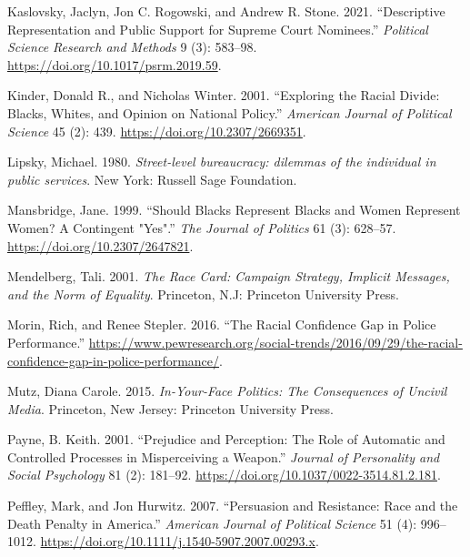 \documentclass[
  12pt,
]{article}
\newlength{\cslhangindent}
\newlength{\cslentryspacingunit} %
\newenvironment{CSLReferences}[2] %
 {%
  \setlength{\parindent}{0pt}
  \ifodd #1
  \let\oldpar\par
  \def\par{\hangindent=\cslhangindent\oldpar}
  \fi
  \setlength{\parskip}{#2\cslentryspacingunit}
 }%
 {}
\begin{document}
\begin{CSLReferences}{1}{0}
\leavevmode{}%
Kaslovsky, Jaclyn, Jon C. Rogowski, and Andrew R. Stone. 2021.
{``Descriptive Representation and Public Support for Supreme Court
Nominees.''} \emph{Political Science Research and Methods} 9 (3):
583--98. \url{https://doi.org/10.1017/psrm.2019.59}.

\leavevmode{}%
Kinder, Donald R., and Nicholas Winter. 2001. {``Exploring the Racial
Divide: Blacks, Whites, and Opinion on National Policy.''}
\emph{American Journal of Political Science} 45 (2): 439.
\url{https://doi.org/10.2307/2669351}.

\leavevmode{}%
Lipsky, Michael. 1980. \emph{Street-level bureaucracy: dilemmas of the
individual in public services}. New York: Russell Sage Foundation.

\leavevmode{}%
Mansbridge, Jane. 1999. {``Should Blacks Represent Blacks and Women
Represent Women? A Contingent {"}Yes{"}.''} \emph{The Journal of
Politics} 61 (3): 628--57. \url{https://doi.org/10.2307/2647821}.

\leavevmode{}%
Mendelberg, Tali. 2001. \emph{The Race Card: Campaign Strategy, Implicit
Messages, and the Norm of Equality}. Princeton, N.J: Princeton
University Press.

\leavevmode{}%
Morin, Rich, and Renee Stepler. 2016. {``The Racial Confidence Gap in
Police Performance.''}
\url{https://www.pewresearch.org/social-trends/2016/09/29/the-racial-confidence-gap-in-police-performance/}.

\leavevmode{}%
Mutz, Diana Carole. 2015. \emph{In-Your-Face Politics: The Consequences
of Uncivil Media}. Princeton, New Jersey: Princeton University Press.

\leavevmode{}%
Payne, B. Keith. 2001. {``Prejudice and Perception: The Role of
Automatic and Controlled Processes in Misperceiving a Weapon.''}
\emph{Journal of Personality and Social Psychology} 81 (2): 181--92.
\url{https://doi.org/10.1037/0022-3514.81.2.181}.

\leavevmode{}%
Peffley, Mark, and Jon Hurwitz. 2007. {``Persuasion and Resistance: Race
and the Death Penalty in America.''} \emph{American Journal of Political
Science} 51 (4): 996--1012.
\url{https://doi.org/10.1111/j.1540-5907.2007.00293.x}.


\end{CSLReferences}
\end{document}
